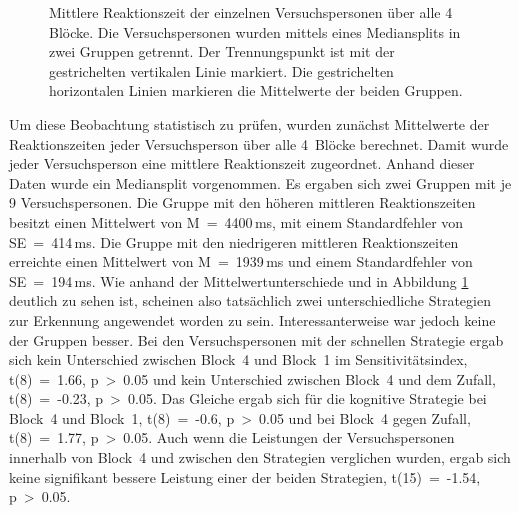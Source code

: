 \documentclass[doc,a4paper,12pt]{apa6}
\begin{document}
\begin{figure}[t]
  \centering
  \begin{minipage}{\textwidth}
    \vspace{10pt}
    \caption{Mittlere Reaktionszeit der einzelnen Versuchspersonen über alle 4 Blöcke. Die Versuchspersonen wurden mittels eines Mediansplits in zwei Gruppen getrennt. Der Trennungspunkt ist mit der gestrichelten vertikalen Linie markiert. Die gestrichelten horizontalen Linien markieren die Mittelwerte der beiden Gruppen.}
    \label{strat}
  \end{minipage}
\end{figure}

Um diese Beobachtung statistisch zu prüfen, wurden zunächst Mittelwerte der Reaktionszeiten jeder Versuchsperson über alle 4~Blöcke berechnet. Damit wurde jeder Versuchsperson eine mittlere Reaktionszeit zugeordnet. Anhand dieser Daten wurde ein Mediansplit vorgenommen. Es ergaben sich zwei Gruppen mit je 9 Versuchspersonen. Die Gruppe mit den höheren mittleren Reaktionszeiten besitzt einen Mittelwert von M~=~4400\,ms, mit einem Standardfehler von SE~=~414\,ms. Die Gruppe mit den niedrigeren mittleren Reaktionszeiten erreichte einen Mittelwert von M~=~1939\,ms und einem Standardfehler von SE~=~194\,ms. Wie anhand der Mittelwertunterschiede und in Abbildung \ref{strat} deutlich zu sehen ist, scheinen also tatsächlich zwei unterschiedliche Strategien zur Erkennung angewendet worden zu sein. Interessanterweise war jedoch keine der Gruppen besser. Bei den Versuchspersonen mit der schnellen Strategie ergab sich kein Unterschied zwischen Block~4 und Block~1 im Sensitivitätsindex, t(8)~=~1.66, p~>~0.05 und kein Unterschied zwischen Block~4 und dem Zufall, t(8)~=~-0.23, p~>~0.05. Das Gleiche ergab sich für die kognitive Strategie bei Block~4 und Block~1, t(8)~=~-0.6, p~>~0.05 und bei Block~4 gegen Zufall, t(8)~=~1.77, p~>~0.05. Auch wenn die Leistungen der Versuchspersonen innerhalb von Block~4 und zwischen den Strategien verglichen wurden, ergab sich keine signifikant bessere Leistung einer der beiden Strategien, t(15)~=~-1.54, p~>~0.05.
\end{document}
